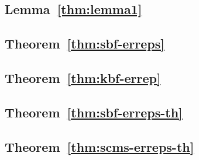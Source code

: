 \label{sec:keyless-proof}
\label{sec:proof/sbf-erreps}
\label{sec:proof/kbf-errep}
\label{sec:proof/sbf-erreps-th}
\label{sec:proof/scms-erreps-th}

\subsection*{Lemma~\ref{thm:lemma1}}


\subsection*{Theorem~\ref{thm:sbf-erreps}}


\subsection*{Theorem~\ref{thm:kbf-errep}}


\subsection*{Theorem~\ref{thm:sbf-erreps-th}}


\subsection*{Theorem~\ref{thm:scms-erreps-th}}

